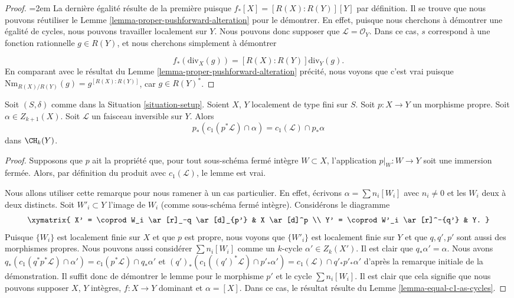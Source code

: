 \begin{proof}
{\emergencystretch=2em La dernière égalité résulte de la première puisque $f_*[X] = [R(X) : R(Y)][Y]$
par définition. Il se trouve que nous pouvons réutiliser le
Lemme \ref{lemma-proper-pushforward-alteration}
pour le démontrer. En effet, puisque nous cherchons à démontrer une égalité
de cycles, nous pouvons travailler localement sur $Y$. Nous pouvons donc supposer
que $\mathcal{L} = \mathcal{O}_Y$. Dans ce cas, $s$
correspond à une fonction rationnelle $g \in R(Y)$, et
nous cherchons simplement à démontrer\par}
$$
f_*\left(\text{div}_X(g)\right) =
[R(X) : R(Y)]\text{div}_Y(g).
$$
En comparant avec le résultat du
Lemme \ref{lemma-proper-pushforward-alteration} précité,
nous voyons que c'est vrai puisque
$\text{Nm}_{R(X)/R(Y)}(g) = g^{[R(X) : R(Y)]}$,
car $g \in R(Y)^*$.
\end{proof}

\begin{lemma}
\label{lemma-pushforward-cap-c1}
Soit $(S, \delta)$ comme dans la Situation \ref{situation-setup}.
Soient $X$, $Y$ localement de type fini sur $S$.
Soit $p : X \to Y$ un morphisme propre.
Soit $\alpha \in Z_{k + 1}(X)$.
Soit $\mathcal{L}$ un faisceau inversible sur $Y$.
Alors
$$
p_*(c_1(p^*\mathcal{L}) \cap \alpha) = c_1(\mathcal{L}) \cap p_*\alpha
$$
dans $\CH_k(Y)$.
\end{lemma}

\begin{proof}
Supposons que $p$ ait la propriété que, pour tout sous-schéma fermé
intègre $W \subset X$, l'application $p|_W : W \to Y$
soit une immersion fermée. Alors, par définition du produit
avec $c_1(\mathcal{L})$, le lemme est vrai.

\medskip\noindent
Nous allons utiliser cette remarque pour nous ramener à un cas particulier. En effet,
écrivons $\alpha = \sum n_i[W_i]$ avec $n_i \not = 0$ et les $W_i$ deux à deux
distincts. Soit $W'_i \subset Y$ l'image de $W_i$ (comme sous-schéma
fermé intègre). Considérons le diagramme
$$
\xymatrix{
X' = \coprod W_i \ar[r]_-q \ar[d]_{p'} & X \ar[d]^p \\
Y' = \coprod W'_i \ar[r]^-{q'} & Y.
}
$$
Puisque $\{W_i\}$ est localement finie sur $X$ et que $p$ est propre,
nous voyons que $\{W'_i\}$ est localement finie sur $Y$ et que
$q, q', p'$ sont aussi des morphismes propres.
Nous pouvons aussi considérer $\sum n_i[W_i]$ comme un $k$-cycle
$\alpha' \in Z_k(X')$. Il est clair que $q_*\alpha' = \alpha$.
Nous avons
$q_*(c_1(q^*p^*\mathcal{L}) \cap \alpha')
= c_1(p^*\mathcal{L}) \cap q_*\alpha'$
et
$(q')_*(c_1((q')^*\mathcal{L}) \cap p'_*\alpha') =
c_1(\mathcal{L}) \cap q'_*p'_*\alpha'$ d'après la remarque initiale
de la démonstration. Il suffit donc de démontrer le lemme
pour le morphisme $p'$ et le cycle $\sum n_i[W_i]$.
Il est clair que cela signifie que nous pouvons supposer $X$, $Y$ intègres,
$f : X \to Y$ dominant et $\alpha = [X]$.
Dans ce cas, le résultat résulte du
Lemme \ref{lemma-equal-c1-as-cycles}.
\end{proof}






